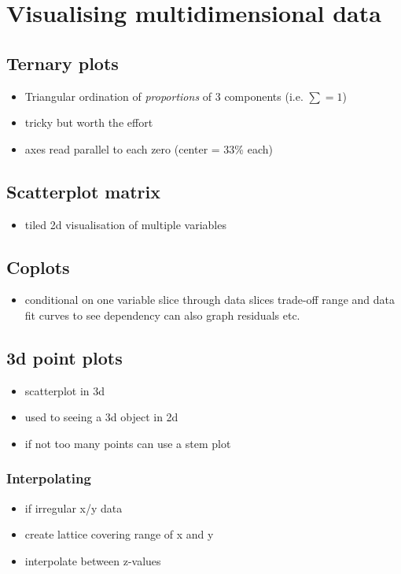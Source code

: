 \section{Visualising multidimensional data}
\subsection{Ternary plots}
\begin{itemize}
	\item Triangular ordination of \textit{proportions} of 3 components (i.e. $\sum=1$)
	\item tricky but worth the effort
	\item axes read parallel to each zero (center = 33\% each)	
\end{itemize}

\subsection{Scatterplot matrix}
\begin{itemize}
	\item tiled 2d visualisation of multiple variables
\end{itemize}

\subsection{Coplots}
\begin{itemize}
	\item conditional on one variable
	\subitem slice through data
	\subitem slices trade-off range and data
	\subitem fit curves to see dependency
	\subitem can also graph residuals etc.	
\end{itemize}

\subsection{3d point plots}
\begin{itemize}
	\item scatterplot in 3d
	\item used to seeing a 3d object in 2d
	\item if not too many points can use a stem plot	
\end{itemize}

\subsubsection{Interpolating}
\begin{itemize}
	\item if irregular x/y data
	\item create lattice covering range of x and y
	\item interpolate between z-values	
\end{itemize}

